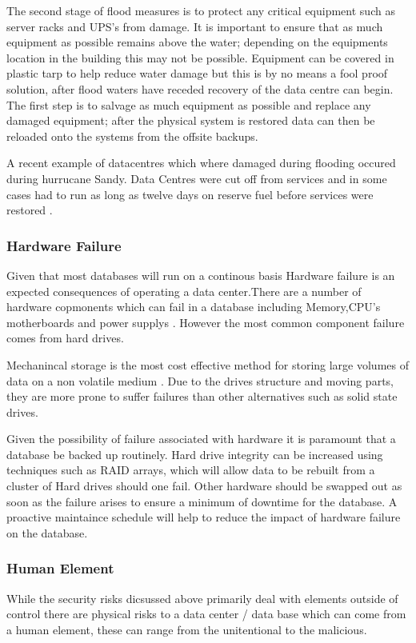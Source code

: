 \documentclass[11pt, twocolumn]{article}
\begin{document}
The second stage of flood measures is to protect any critical equipment such as server racks and UPS's from damage.  It is important to ensure that as much equipment as possible remains above the water; depending on the equipments location in the building this may not be possible.  Equipment can be covered in plastic tarp to help reduce water damage but this is by no means a fool proof solution, after flood waters have receded recovery of the data centre can begin. The first step is to salvage as much equipment as possible and replace any damaged equipment; after the physical system is restored data can then be reloaded onto the systems from the offsite backups.

A recent example of datacentres which where damaged during flooding occured during hurrucane Sandy. Data Centres were cut off from services and in some cases had to run as long as twelve days on reserve fuel before services were restored \cite{sean4}.



\subsubsection{Hardware Failure}
Given that most databases will run on a continous basis Hardware failure is an expected consequences of operating a data center.There are a number of hardware copmonents which can fail in a database including Memory,CPU's motherboards and power supplys \cite{sean9}.  However the most common component failure comes from hard drives.

Mechanincal storage is the most cost effective method for storing large volumes of data on a non volatile medium \cite{sean2}. Due to the drives structure and moving parts, they are more prone to suffer failures than other alternatives such as  solid state drives.

Given the possibility of failure associated with hardware it is paramount that a database be backed up routinely.  Hard drive integrity can be increased using techniques such as RAID arrays, which will allow data to be rebuilt from a cluster of Hard drives should one fail.  Other hardware should be swapped out as soon as the failure arises to ensure a minimum of downtime for the database. A proactive maintaince schedule will help to reduce the impact of hardware failure on the database.

\subsubsection{Human Element}
While the security risks dicsussed above primarily deal with elements outside of control there are physical risks to a data center / data base which can come from a human element, these can range from the unitentional to the malicious.
\end{document}

